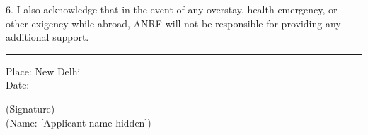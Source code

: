 \documentclass[12pt,a4paper]{article}
\begin{document}
6. I also acknowledge that in the event of any overstay, health emergency, or other exigency while abroad, ANRF will not be responsible for providing any additional support.

\vspace{0.05in}
\noindent\rule{\textwidth}{0.4pt}

\vfill

\begin{minipage}[t]{0.45\textwidth}
Place: New Delhi\\
Date:
\end{minipage}
\hfill
\begin{minipage}[t]{0.34\textwidth}
(Signature)\\
(Name: [Applicant name hidden])
\end{minipage}
\end{document}
